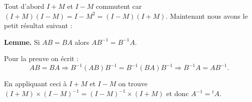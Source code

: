 {\begin{enumerate}
{Tout d'abord $I+M$ et $I-M$ commutent car $(I+M)(I-M) = I-M^2 = (I-M)(I+M)$.
Maintenant nous avons le petit résultat suivant :

\textbf{Lemme.} Si $AB=BA$ alors $AB^{-1}=B^{-1}A$.

Pour la preuve on écrit :
$$AB=BA \Rightarrow B^{-1}(AB)B^{-1}=B^{-1}(BA)B^{-1} \Rightarrow B^{-1}A=AB^{-1}.$$

En appliquant ceci à $I+M$ et $I-M$ on trouve $(I+M)\times (I-M) ^{-1}= (I-M) ^{-1}\times(I+M)$
et donc $A^{-1}={}^t\!A$.}
\end{enumerate}
}